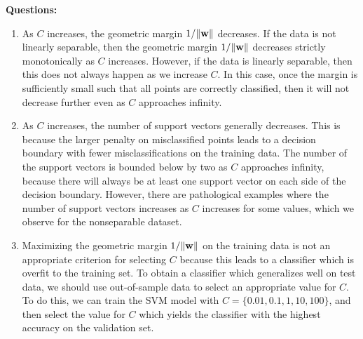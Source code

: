 {\bf Questions:}
%
\begin{enumerate}[label=(\alph*)]
	\item As $C$ increases, the geometric margin $1/\|\boldsymbol{\mathbf{w}}\|$ decreases.  If the data is not linearly separable, then
	the geometric margin $1/\|\boldsymbol{\mathbf{w}}\|$ decreases strictly monotonically as $C$ increases.  However, if the data is linearly
	separable, then this does not always happen as we increase $C$.  In this case, once the margin is sufficiently small
	such that all points are correctly classified, then it will not decrease further even as $C$ approaches infinity.  
	
	\item As $C$ increases, the number of support vectors generally decreases.  This is because the larger penalty on misclassified
	points leads to a decision boundary with fewer misclassifications on the training data.  The number of the
	support vectors is bounded below by two as $C$ approaches infinity, because there will always be at least one support vector
	on each side of the decision boundary.  However, there are pathological examples where the number of support vectors increases as $C$ increases for some values, which we observe for the nonseparable dataset.  
	
	\item Maximizing the geometric margin $1/\|\boldsymbol{\mathbf{w}}\|$ on the training data is not an appropriate criterion for selecting
	$C$ because this leads to a classifier which is overfit to the training set.  To obtain a classifier which generalizes well
	on test data, we should use out-of-sample data to select an appropriate value for $C$.  To do this, we can train the SVM model
	with $C = \{0.01,0.1,1,10,100\}$, and then select the value for $C$ which yields the classifier with the highest
	accuracy on the validation set.  

\end{enumerate}

